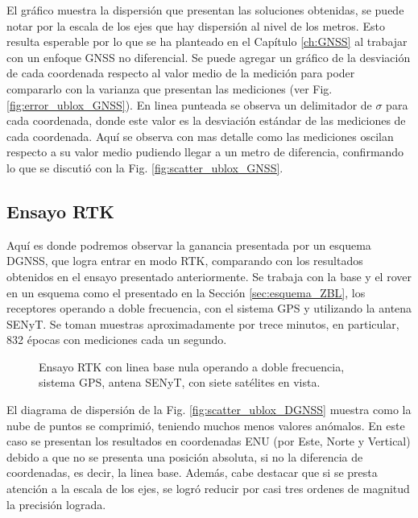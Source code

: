 \documentclass[a4paper,12pt,oneside,onecolumn,final,openright]{book}%
\begin{document}
	El gráfico muestra la dispersión que presentan las soluciones obtenidas, se puede notar por la escala de los ejes que hay dispersión al nivel de los metros. Esto resulta esperable por lo que se ha planteado en el Capítulo \ref{ch:GNSS} al trabajar con un enfoque GNSS no diferencial. Se puede agregar un gráfico de la desviación de cada coordenada respecto al valor medio de la medición para poder compararlo con la varianza que presentan las mediciones (ver Fig. \ref{fig:error_ublox_GNSS}). En linea punteada se observa un delimitador de $\sigma$ para cada coordenada, donde este valor es la desviación estándar de las mediciones de cada coordenada. Aquí se observa con mas detalle como las mediciones oscilan respecto a su valor medio pudiendo llegar a un metro de diferencia, confirmando lo que se discutió con la Fig. \ref{fig:scatter_ublox_GNSS}.

\subsection{Ensayo RTK}
	Aquí es donde podremos observar la ganancia presentada por un esquema DGNSS, que logra entrar en modo RTK, comparando con los resultados obtenidos en el ensayo presentado anteriormente. Se trabaja con la base y el rover en un esquema como el presentado en la Sección \ref{sec:esquema_ZBL}, los receptores operando a doble frecuencia, con el sistema GPS y utilizando la antena SENyT. Se toman muestras aproximadamente por trece minutos, en particular, 832 épocas con mediciones cada un segundo. 
	
\begin{figure}
\centering
{}

\centering
{}
\caption{Ensayo RTK con linea base nula operando a doble frecuencia, sistema GPS, antena SENyT, con siete satélites en vista.}
\label{fig:ensayoDGNSS_ublox}
\end{figure}
	
	El diagrama de dispersión de la Fig. \ref{fig:scatter_ublox_DGNSS} muestra como la nube de puntos se comprimió, teniendo muchos menos valores anómalos. En este caso se presentan los resultados en coordenadas ENU (por Este, Norte y Vertical) debido a que no se presenta una posición absoluta, si no la diferencia de coordenadas, es decir, la linea base. Además, cabe destacar que si se presta atención a la escala de los ejes, se logró reducir por casi tres ordenes de magnitud la precisión lograda. 
	
\end{document}
